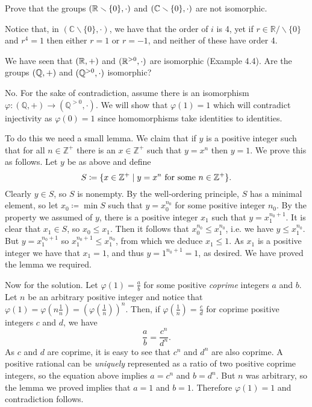 \begin{exercise}
	Prove that the groups $(\mathbb{R}\smallsetminus\{0\},\cdot)$ and $(\mathbb{C}\smallsetminus\{0\}, \cdot)$ are not isomorphic.
\end{exercise}
\begin{solution}
	Notice that, in $(\mathbb{C}\smallsetminus\{0\},\cdot)$, we have that the order of $i$ is 4, yet if $r\in \mathbb{R}/\smallsetminus\{0\}$ and $r^4 = 1$ then either $r = 1$ or $r = -1$, and neither of these have order 4.
\end{solution}

\begin{exercise}
	We have seen that $(\mathbb{R},+)$ and $(\mathbb{R}^{>0}, \cdot)$ are isomorphic (Example 4.4). Are the groups $(\mathbb{Q},+)$ and $(\mathbb{Q}^{>0}, \cdot)$ isomorphic?
\end{exercise}
\begin{solution}
	No. For the sake of contradiction, assume there is an isomorphism $\varphi\colon (\mathbb{Q},+)\to (\mathbb{Q}^{>0}, \cdot)$. We will show that $\varphi(1) = 1$ which will contradict injectivity as $\varphi(0) = 1$ since homomorphisms take identities to identities.
	
	To do this we need a small lemma. We claim that if $y$ is a positive integer such that for all $n\in\mathbb{Z}^+$ there is an $x\in\mathbb{Z}^+$ such that $y = x^n$ then $y = 1$. We prove this as follows. Let $y$ be as above and define
	\[
		S \coloneqq \{x\in\mathbb{Z}^+ \mid y = x^n \textnormal{ for some }n\in\mathbb{Z}^+\}.
	\]
	Clearly $y\in S$, so $S$ is nonempty. By the well-ordering principle, $S$ has a minimal element, so let $x_0\coloneqq \min S$ such that $y = x_0^{n_0}$ for some positive integer $n_0$. By the property we assumed of $y$, there is a positive integer $x_1$ such that $y = x_1^{n_0 + 1}$. It is clear that $x_1\in S$, so $x_0\leq x_1$. Then it follows that $x_0^{n_0} \leq x_1^{n_0}$, i.e. we have $y\leq x_1^{n_0}$. But $y = x_1^{n_0 + 1}$ so $x_1^{n_0+1} \leq x_1^{n_0}$, from which we deduce $x_1\leq 1$. As $x_1$ is a positive integer we have that $x_1 = 1$, and thus $y = 1^{n_0 + 1} = 1$, as desired. We have proved the lemma we required.
	
	Now for the solution. Let $\varphi(1) = \frac{a}{b}$ for some positive \emph{coprime} integers $a$ and $b$. Let $n$ be an arbitrary positive integer and notice that $\varphi(1) = \varphi(n\frac{1}{n}) = (\varphi(\frac{1}{n}))^n$. Then, if $\varphi(\frac{1}{n}) = \frac{c}{d}$ for coprime positive integers $c$ and $d$, we have
	\[
		\frac{a}{b} = \frac{c^n}{d^n}.
	\]
	As $c$ and $d$ are coprime, it is easy to see that $c^n$ and $d^n$ are also coprime. A positive rational can be \emph{uniquely} represented as a ratio of two positive coprime integers, so the equation above implies $a = c^n$ and $b = d^n$. But $n$ was arbitrary, so the lemma we proved implies that $a = 1$ and $b =1$. Therefore $\varphi(1) = 1$ and contradiction follows.
\end{solution}

